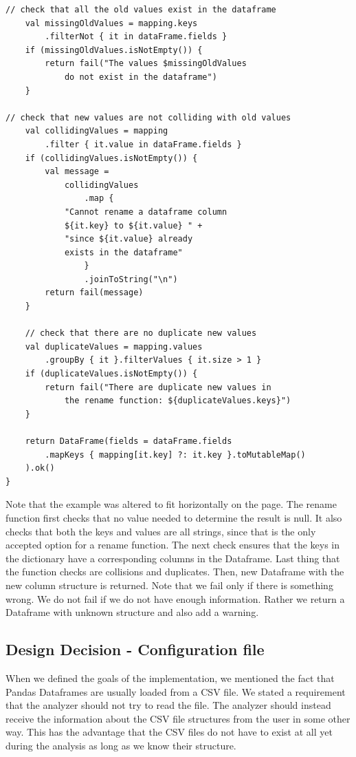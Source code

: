 \begin{lstlisting}[caption=The rename function of DataFrame\_RenameFunc, label={lst:rename_invoke}, captionpos=b]
    // check that all the old values exist in the dataframe
    val missingOldValues = mapping.keys
        .filterNot { it in dataFrame.fields }
    if (missingOldValues.isNotEmpty()) {
        return fail("The values $missingOldValues
            do not exist in the dataframe")
    }

// check that new values are not colliding with old values
    val collidingValues = mapping
        .filter { it.value in dataFrame.fields }
    if (collidingValues.isNotEmpty()) {
        val message =
            collidingValues
                .map {
            "Cannot rename a dataframe column
            ${it.key} to ${it.value} " +
            "since ${it.value} already
            exists in the dataframe"
                }
                .joinToString("\n")
        return fail(message)
    }

    // check that there are no duplicate new values
    val duplicateValues = mapping.values
        .groupBy { it }.filterValues { it.size > 1 }
    if (duplicateValues.isNotEmpty()) {
        return fail("There are duplicate new values in
            the rename function: ${duplicateValues.keys}")
    }

    return DataFrame(fields = dataFrame.fields
        .mapKeys { mapping[it.key] ?: it.key }.toMutableMap()
    ).ok()
}
\end{lstlisting}

Note that the example was altered to fit horizontally on the page.
The rename function first checks that no value needed to determine the result is null.
It also checks that both the keys and values are all strings, since that is the only accepted option for a rename
function.
The next check ensures that the keys in the dictionary have a corresponding columns in the Dataframe.
Last thing that the function checks are collisions and duplicates.
Then, new Dataframe with the new column structure is returned.
Note that we fail only if there is something wrong.
We do not fail if we do not have enough information.
Rather we return a Dataframe with unknown structure and also add a warning.

\subsection{Design Decision - Configuration file}\label{subsec:configuration-file}

When we defined the goals of the implementation, we mentioned the fact that Pandas Dataframes are usually loaded
from a CSV file.
We stated a requirement that the analyzer should not try to read the file.
The analyzer should instead receive the information about the CSV file structures from the user in some other way.
This has the advantage that the CSV files do not have to exist at all yet during the analysis as long as we know their
structure.

